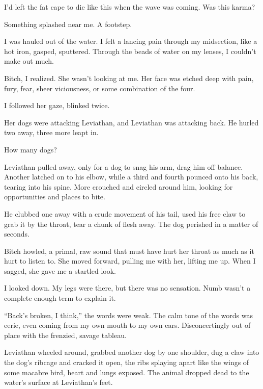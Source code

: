 I'd left the fat cape to die like this when the wave was coming.  Was this karma?



Something splashed near me.  A footstep.



I was hauled out of the water.  I felt a lancing pain through my midsection, like a hot iron, gasped, sputtered.  Through the beads of water on my lenses, I couldn't make out much.



Bitch, I realized.  She wasn't looking at me.  Her face was etched deep with pain, fury, fear, sheer viciousness, or some combination of the four.



I followed her gaze, blinked twice.



Her dogs were attacking Leviathan, and Leviathan was attacking back.  He hurled two away, three more leapt in.



How many dogs?



Leviathan pulled away, only for a dog to snag his arm, drag him off balance.  Another latched on to his elbow, while a third and fourth pounced onto his back, tearing into his spine.  More crouched and circled around him, looking for opportunities and places to bite.



He clubbed one away with a crude movement of his tail, used his free claw to grab it by the throat, tear a chunk of flesh away.  The dog perished in a matter of seconds.



Bitch howled, a primal, raw sound that must have hurt her throat as much as it hurt to listen to.  She moved forward, pulling me with her, lifting me up.  When I sagged, she gave me a startled look.



I looked down.  My legs were there, but there was no sensation.  Numb wasn't a complete enough term to explain it.



``Back's broken, I think,'' the words were weak.  The calm tone of the words was eerie, even coming from my own mouth to my own ears.  Disconcertingly out of place with the frenzied, savage tableau.



Leviathan wheeled around, grabbed another dog by one shoulder, dug a claw into the dog's ribcage and cracked  it open, the ribs splaying apart like the wings of some macabre bird, heart and lungs exposed.  The animal dropped dead to the water's surface at Leviathan's feet.



